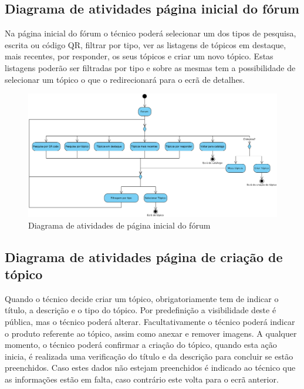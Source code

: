 \newpage

\subsection{Diagrama de atividades página inicial do fórum}

Na página inicial do fórum o técnico poderá selecionar um dos tipos de pesquisa, escrita ou código QR, filtrar por tipo, ver as listagens de tópicos em destaque, mais recentes, por responder, os seus tópicos e criar um novo tópico. Estas listagens poderão ser filtradas por tipo e sobre as mesmas tem a possibilidade de selecionar um tópico o que o redirecionará para o ecrã de detalhes.

\begin{figure}[htb]
    \centering
    \includegraphics[width=\textwidth]{images/diagramas/atividades/diagrama_atividades_forum.png}
    \caption{Diagrama de atividades de página inicial do fórum}
    \label{fig:36}
\end{figure}

\newpage

\subsection{Diagrama de atividades página de criação de tópico}

Quando o técnico decide criar um tópico, obrigatoriamente tem de indicar o título, a descrição e o tipo do tópico. Por predefinição a visibilidade deste é pública, mas o técnico poderá alterar. Facultativamente o técnico poderá indicar o produto referente ao tópico, assim como anexar e remover imagens. A qualquer momento, o técnico poderá confirmar a criação do tópico, quando esta ação inicia, é realizada uma verificação do título e da descrição para concluir se estão preenchidos. Caso estes dados não estejam preenchidos é indicado ao técnico que as informações estão em falta, caso contrário este volta para o ecrã anterior.

